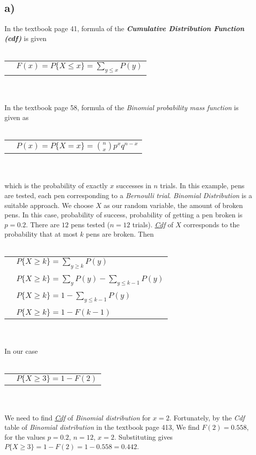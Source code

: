 \documentclass[12pt]{article}
\begin{document}
\subsection*{a)}
In the textbook page 41, formula of the \hypertarget{cdf}{\textit{\textbf{Cumulative Distribution Function (cdf) }}} is given
\\ \\
\begin{tabular}{l l}
    & $F(x)=P\{ X \leq x \}=\sum\limits_{y \leq x} P(y)$\\
\end{tabular}
\\ \\
In the textbook page 58, formula of the \textit{Binomial probability mass function} is given as
\\ \\
\begin{tabular}{l l}
    & $P (x) = P \{X = x\} = \binom nx p^xq^{n-x}$\\
\end{tabular}
\\ \\
which is the probability of exactly $x$ successes in $n$ trials.
In this example, pens are tested, each pen corresponding to a \textit{Bernoulli trial}.
\textit{Binomial Distribution} is a suitable approach. We choose $X$ as our random variable, 
the amount of broken pens. In this case, probability of success, probability of getting a pen broken is 
$p=0.2$. There are $12$ pens tested ($n=12$ trials).
\hyperlink{cdf}{\textit{Cdf}} of $X$ corresponds to the probability that
at most $k$ pens are broken. Then
\\ \\
\begin{tabular}{l l}
    & $P\{X \geq k \}=\sum\limits_{y \geq k} P(y)$\\
    & \\
    & $P\{X \geq k \}=\sum\limits_{y} P(y)-\sum\limits_{y \leq k-1} P(y)$\\
    & \\
    & $P\{X \geq k \}=1-\sum\limits_{y \leq k-1} P(y)$\\
    & \\
    & $P\{X \geq k \}=1-F(k-1)$\\
\end{tabular}
\\ \\
In our case
\\ \\
\begin{tabular}{l l}
    & $P\{X \geq 3 \}=1-F(2)$\\
\end{tabular}
\\ \\
We need to find \hyperlink{cdf}{\textit{Cdf}} of \textit{Binomial distribution} for $x=2$. 
Fortunately, by the \textit{Cdf} table of \textit{Binomial distribution} in the textbook page 413,
We find $F(2)=0.558$, for the values $p=0.2$, $n=12$, $x=2$. Substituting
\hypertarget{arg1}{gives} $P\{X \geq 3 \}=1-F(2)=1-0.558=0.442$.
\end{document}
